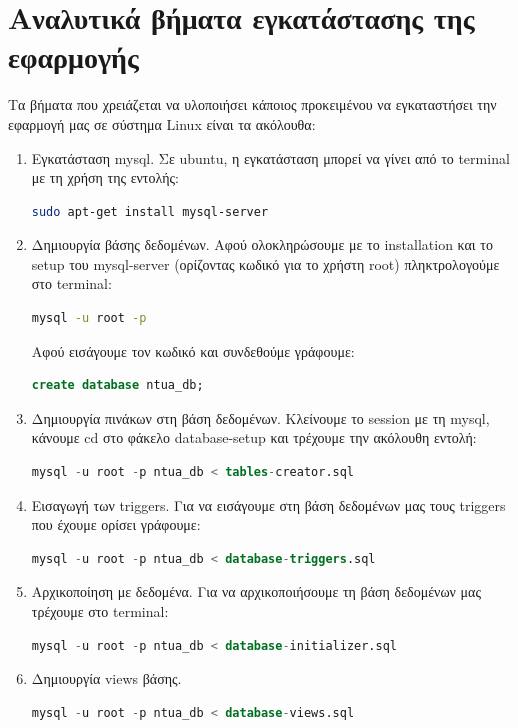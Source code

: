 \documentclass[a4paper,oneside, 11pt]{article}
\begin{document}
\section{Αναλυτικά βήματα εγκατάστασης της εφαρμογής}
Τα βήματα που χρειάζεται να υλοποιήσει κάποιος προκειμένου να εγκαταστήσει την εφαρμογή μας σε σύστημα Linux είναι τα ακόλουθα:
\begin{enumerate}

\item Εγκατάσταση mysql. Σε ubuntu, η εγκατάσταση μπορεί να γίνει από το terminal με τη χρήση της εντολής:
\begin{lstlisting}[language=bash]
sudo apt-get install mysql-server
\end{lstlisting}
\item Δημιουργία βάσης δεδομένων. \bigbreak 
Αφού ολοκληρώσουμε με το installation και το setup του mysql-server (ορίζοντας κωδικό για το χρήστη root) πληκτρολογούμε στο terminal:
\begin{lstlisting}[language=bash]
mysql -u root -p
\end{lstlisting}
Αφού εισάγουμε τον κωδικό και συνδεθούμε γράφουμε:
\begin{lstlisting}[language=SQL]
create database ntua_db;
\end{lstlisting}
\item Δημιουργία πινάκων στη βάση δεδομένων. \bigbreak 
Κλείνουμε το session με τη mysql, κάνουμε cd στο φάκελο database-setup και τρέχουμε την ακόλουθη εντολή:
\begin{lstlisting}[language=SQL]
mysql -u root -p ntua_db < tables-creator.sql
\end{lstlisting}
\item Εισαγωγή των triggers. \bigbreak 
Για να εισάγουμε στη βάση δεδομένων μας τους triggers που έχουμε ορίσει γράφουμε:
\begin{lstlisting}[language=SQL]
mysql -u root -p ntua_db < database-triggers.sql
\end{lstlisting}
\item Αρχικοποίηση με δεδομένα. \bigbreak 
Για να αρχικοποιήσουμε τη βάση δεδομένων μας τρέχουμε στο terminal:
\begin{lstlisting}[language=SQL]
mysql -u root -p ntua_db < database-initializer.sql
\end{lstlisting}
\item Δημιουργία views βάσης. \bigbreak 
\begin{lstlisting}[language=SQL]
mysql -u root -p ntua_db < database-views.sql
\end{lstlisting}

\end{enumerate}
\end{document}

